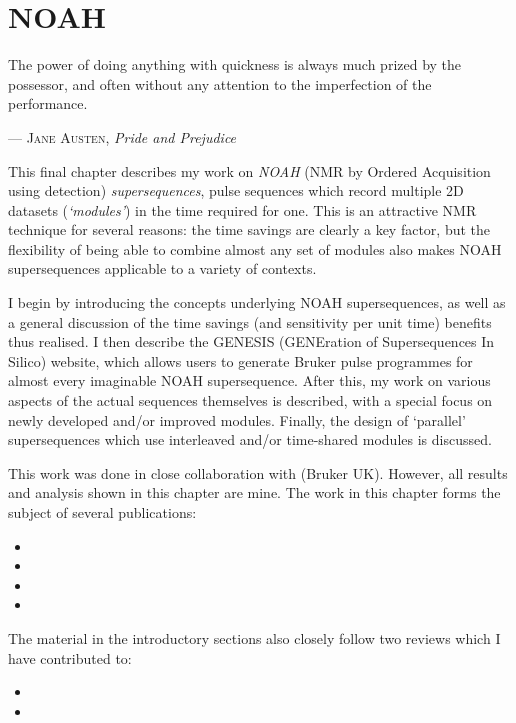 \chapter{NOAH}
\label{chpt:noah}

\epigraph{\singlespacing%
The power of doing anything with quickness is always much prized by the possessor, and often without any attention to the imperfection of the performance.%
}{--- \textsc{Jane Austen}, \textit{Pride and Prejudice}}

This final chapter describes my work on \textit{NOAH} (NMR by Ordered Acquisition using \proton{} detection) \textit{supersequences}, pulse sequences which record multiple 2D datasets (\textit{`modules'}) in the time required for one.
This is an attractive NMR technique for several reasons: the time savings are clearly a key factor, but the flexibility of being able to combine almost any set of modules also makes NOAH supersequences applicable to a variety of contexts.

I begin by introducing the concepts underlying NOAH supersequences, as well as a general discussion of the time savings (and sensitivity per unit time) benefits thus realised.
I then describe the GENESIS (GENEration of Supersequences In Silico) website, which allows users to generate Bruker pulse programmes for almost every imaginable NOAH supersequence.
After this, my work on various aspects of the actual sequences themselves is described, with a special focus on newly developed and/or improved modules.
Finally, the design of `parallel' supersequences which use interleaved and/or time-shared modules is discussed.

This work was done in close collaboration with \EK{} (Bruker UK).
However, all results and analysis shown in this chapter are mine.
The work in this chapter forms the subject of several publications:

\begin{itemize}
    \item {}
    \item {}
    \item {}
    \item {}
\end{itemize}

The material in the introductory sections also closely follow two reviews which I have contributed to:
\begin{itemize}
    \item {}
    \item {}
\end{itemize}

\clearpage








\printbibliography[heading=subbibnumbered]{}
